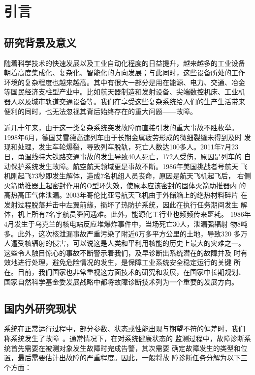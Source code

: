 \chapter{引言}
\label{cha:intro}

\section{研究背景及意义}

随着科学技术的快速发展以及工业自动化程度的日益提升，越来越多的工业设备
朝着高度集成化、复杂化、智能化的方向发展；与此同时，这些设备所处的工作
环境的复杂程度也越来越高。其中有很大一部分是用在能源、电力、交通、冶金
等国民经济支柱型产业中。比如航天器制造和发射设备、尖端数控机床、工业机
器人以及城市轨道交通设备等。我们在享受这些复杂系统给人们的生产生活带来
便利的同时，也无法忽视其背后始终存在的重大问题——故障。

近几十年来，由于这一类复杂系统突发故障而直接引发的重大事故不胜枚举。
1998年6月，德国艾雪德高速列车由于长期金属疲劳形成的微细裂缝未得到及时
发现和处理，发生车轮爆裂，导致列车脱轨，死亡人数达100多人。2011年7月23
日，甬温线特大铁路交通事故的发生导致40人死亡，172人受伤，原因是列车的
自动保护系统发生故障。航空航天领域更是事故不断。1986年美国挑战者号航天
飞机刚起飞73秒即发生解体，造成7名机组人员丧命，原因是航天飞机起飞后，
右侧火箭助推器上起密封作用的O型环失效，使原本应该密封的固体火箭助推器内
的高热高压气体泄漏。2003年哥伦比亚号航天飞机由于外储箱上的绝热材料碎片
在发射过程脱落并击中左翼前缘，损坏了热防护系统，因此在执行任务期间发生
解体，机上所有7名宇航员瞬间遇难。此外，能源化工行业也频频传来噩耗。
1986年4月发生于乌克兰的核电站反应堆爆炸事件中，当场死亡30人，泄漏强辐射
物8吨多。此外，这次核泄漏事故严重污染了附近6万多平方公里的土地，导致320
多万人遭受核辐射的侵害，可以说这是人类和平利用核能的历史上最大的灾难之一。
这些令人触目惊心的事故不断警示着我们，及早诊断出系统潜在的故障并及
时有效地进行处理，避免危险情况的发生，是保障工业系统安全稳定运行的关键
所在。目前，我们国家也非常重视这方面技术的研究和发展，在国家中长期规划、
国家自然科学基金委发展战略中都将故障诊断技术列为一个重要的发展方向。

\section{国内外研究现状}

系统在正常运行过程中，部分参数、状态或性能出现与期望不符的偏差时，我们
称系统发生了故障~\cite{van1997remarks}。通常情况下，在对系统健康状态的
监测过程中，故障诊断系统首先需要在被测对象发生故障时完成告警，其次需要
确定故障发生的类型和位置，最后需要估计出故障的严重程度。因此，一般将故
障诊断任务分解为以下三个方面：

